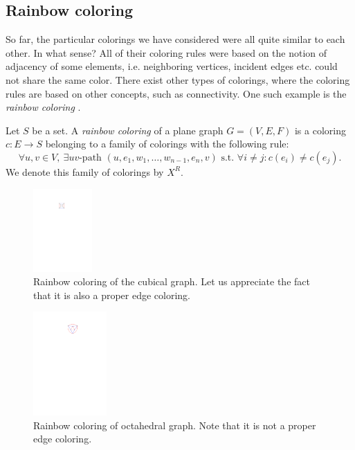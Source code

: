 \subsection{Rainbow coloring}

So far, the particular colorings we have considered were all quite similar to each other. In what sense? All of their coloring rules were based on the notion of adjacency of some elements, i.e. neighboring vertices, incident edges etc. could not share the same color. There exist other types of colorings, where the coloring rules are based on other concepts, such as connectivity. One such example is the \textit{rainbow coloring} \cite{chartrand08}.

\begin{defn}
    Let $S$ be a set. A \emph{rainbow coloring} of a plane graph $G = (V, E, F)$ is a coloring $c : E \rightarrow S$ belonging to a family of colorings with the following rule: 
    \begin{equation}\label{eqn:rainbow_rule}
     \forall u, v \in V, \ \exists uv \text{-path } (u, e_1, w_1, \ldots , w_{n-1}, e_n, v) \text{ s.t. } \forall i \neq j : c(e_i) \neq c(e_j). \tag{$R_R$}
    \end{equation}
    We denote this family of colorings by $X^R$.
\end{defn}

\begin{figure}[H]
    \centering
    \includegraphics[width=0.2\textwidth]{../Resources/Figs/cubical_edg_colr.pdf}
    \caption{Rainbow coloring of the cubical graph. Let us appreciate the fact that it is also a proper edge coloring.}
    \label{fig:cubical_rainbow_coloring}
\end{figure}

\begin{figure}[H]
    \centering
    \includegraphics[width=0.25\textwidth]{../Resources/Figs/octahedral_rainbow_colr.pdf}
    \caption{Rainbow coloring of octahedral graph. Note that it is not a proper edge coloring.}
    \label{fig:octahedral_rainbow_coloring}
\end{figure}

